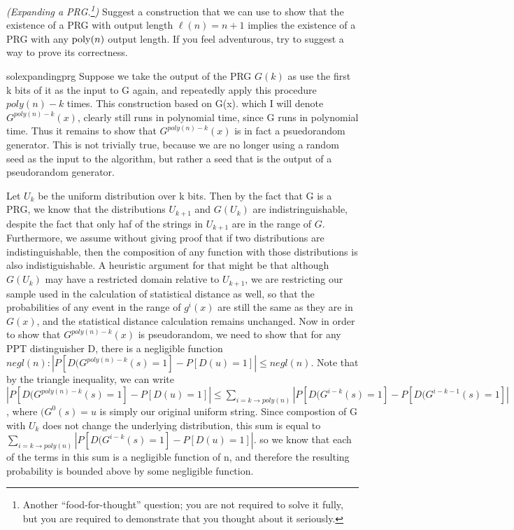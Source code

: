 \begin{questions}
{
\renewcommand*{\thefootnote}{$\clubsuit$}
  \question[2] 
	\emph{(Expanding a PRG.\footnote{Another ``food-for-thought'' question; you are not required to solve it fully, but you are required to demonstrate that you thought about it seriously.\label{fn:fft}})} Suggest a construction that we can use to show that the existence of a PRG with output length $\ell(n)=n+1$ implies the existence of a PRG with any $\operatorname{poly}(n)$ output length. If you feel adventurous, try to suggest a way to prove its correctness.
    \begin{mysolution}{solexpandingprg}
       Suppose we take the output of the PRG  $G(k)$ as use the first k bits of it as the input to G again, and repeatedly apply this procedure $poly(n)-k$ times. This construction based on G(x). which I will denote $G^{poly(n)-k}(x)$, clearly still runs in polynomial time, since G runs in polynomial time. Thus it remains to show that $G^{poly(n)-k}(x)$ is in fact a psuedorandom generator. This is not trivially true, because we are no longer using a random seed as the input to the algorithm, but rather a seed that is the output of a pseudorandom generator. 
       
       Let $U_k$ be the uniform distribution over k bits. Then by the fact that G is a PRG, we know that the distributions $U_{k+1}$ and $G(U_k)$ are indistringuishable, despite the fact that only haf of the strings in $U_{k+1}$ are in the range of $G$. Furthermore, we assume without giving proof that if two distributions are indistinguishable, then the composition of any function with those distributions is also indistiguishable. A heuristic argument for that might be that although $G(U_k)$ may have a restricted domain relative to $U_{k+1}$, 
       we are restricting our sample used in the calculation of statistical distance as well, so that the probabilities of any event in the range of $g^{i}(x)$ are still the same as they are in $G(x)$, and the statistical distance calculation remains unchanged. Now in order to show that $G^{poly(n)-k}(x)$ is pseudorandom, we need to show that for any PPT distinguisher D, 
       there is a negligible function $negl(n): | P[D(G^{poly(n)-k}(s)=1] - P[D(u)=1] | \leq negl(n)$.
        Note that by the triangle inequality, we can write $| P[D(G^{poly(n)-k}(s)=1] - P[D(u)=1] | \leq \sum_{i=k \to poly(n) } | P[D(G^{i-k}(s)=1] - P[D(G^{i-k-1}(s)=1] | $, where $(G^{0}(s)=u$ is simply our original uniform string. Since compostion of G with $U_k$ does not change the underlying distribution, this sum is equal to $\sum_{i=k \to poly(n) } | P[D(G^{i-k}(s)=1] - P[D(u)=1] | $. so we know that each of the terms in this sum is a negligible function of n, and therefore the resulting probability is bounded above by some negligible function. 


\end{mysolution}}
\end{questions}
